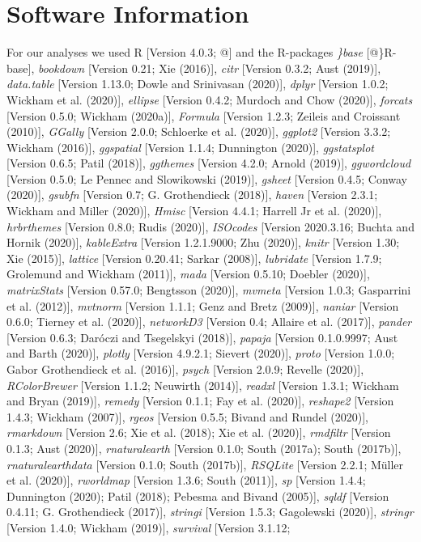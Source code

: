\documentclass[
  american,
  man]{apa7}
\begin{document}
\hypertarget{software-information}{%
\section{Software Information}\label{software-information}}

For our analyses we used R {[}Version 4.0.3; @{]} and the R-packages \emph{\}base} {[}@\}R-base{]}, \emph{bookdown} {[}Version 0.21; Xie (2016){]}, \emph{citr} {[}Version 0.3.2; Aust (2019){]}, \emph{data.table} {[}Version 1.13.0; Dowle and Srinivasan (2020){]}, \emph{dplyr} {[}Version 1.0.2; Wickham et al. (2020){]}, \emph{ellipse} {[}Version 0.4.2; Murdoch and Chow (2020){]}, \emph{forcats} {[}Version 0.5.0; Wickham (2020a){]}, \emph{Formula} {[}Version 1.2.3; Zeileis and Croissant (2010){]}, \emph{GGally} {[}Version 2.0.0; Schloerke et al. (2020){]}, \emph{ggplot2} {[}Version 3.3.2; Wickham (2016){]}, \emph{ggspatial} {[}Version 1.1.4; Dunnington (2020){]}, \emph{ggstatsplot} {[}Version 0.6.5; Patil (2018){]}, \emph{ggthemes} {[}Version 4.2.0; Arnold (2019){]}, \emph{ggwordcloud} {[}Version 0.5.0; Le Pennec and Slowikowski (2019){]}, \emph{gsheet} {[}Version 0.4.5; Conway (2020){]}, \emph{gsubfn} {[}Version 0.7; G. Grothendieck (2018){]}, \emph{haven} {[}Version 2.3.1; Wickham and Miller (2020){]}, \emph{Hmisc} {[}Version 4.4.1; Harrell Jr et al. (2020){]}, \emph{hrbrthemes} {[}Version 0.8.0; Rudis (2020){]}, \emph{ISOcodes} {[}Version 2020.3.16; Buchta and Hornik (2020){]}, \emph{kableExtra} {[}Version 1.2.1.9000; Zhu (2020){]}, \emph{knitr} {[}Version 1.30; Xie (2015){]}, \emph{lattice} {[}Version 0.20.41; Sarkar (2008){]}, \emph{lubridate} {[}Version 1.7.9; Grolemund and Wickham (2011){]}, \emph{mada} {[}Version 0.5.10; Doebler (2020){]}, \emph{matrixStats} {[}Version 0.57.0; Bengtsson (2020){]}, \emph{mvmeta} {[}Version 1.0.3; Gasparrini et al. (2012){]}, \emph{mvtnorm} {[}Version 1.1.1; Genz and Bretz (2009){]}, \emph{naniar} {[}Version 0.6.0; Tierney et al. (2020){]}, \emph{networkD3} {[}Version 0.4; Allaire et al. (2017){]}, \emph{pander} {[}Version 0.6.3; Daróczi and Tsegelskyi (2018){]}, \emph{papaja} {[}Version 0.1.0.9997; Aust and Barth (2020){]}, \emph{plotly} {[}Version 4.9.2.1; Sievert (2020){]}, \emph{proto} {[}Version 1.0.0; Gabor Grothendieck et al. (2016){]}, \emph{psych} {[}Version 2.0.9; Revelle (2020){]}, \emph{RColorBrewer} {[}Version 1.1.2; Neuwirth (2014){]}, \emph{readxl} {[}Version 1.3.1; Wickham and Bryan (2019){]}, \emph{remedy} {[}Version 0.1.1; Fay et al. (2020){]}, \emph{reshape2} {[}Version 1.4.3; Wickham (2007){]}, \emph{rgeos} {[}Version 0.5.5; Bivand and Rundel (2020){]}, \emph{rmarkdown} {[}Version 2.6; Xie et al. (2018); Xie et al. (2020){]}, \emph{rmdfiltr} {[}Version 0.1.3; Aust (2020){]}, \emph{rnaturalearth} {[}Version 0.1.0; South (2017a); South (2017b){]}, \emph{rnaturalearthdata} {[}Version 0.1.0; South (2017b){]}, \emph{RSQLite} {[}Version 2.2.1; Müller et al. (2020){]}, \emph{rworldmap} {[}Version 1.3.6; South (2011){]}, \emph{sp} {[}Version 1.4.4; Dunnington (2020); Patil (2018); Pebesma and Bivand (2005){]}, \emph{sqldf} {[}Version 0.4.11; G. Grothendieck (2017){]}, \emph{stringi} {[}Version 1.5.3; Gagolewski (2020){]}, \emph{stringr} {[}Version 1.4.0; Wickham (2019){]}, \emph{survival} {[}Version 3.1.12; 
\end{document}

